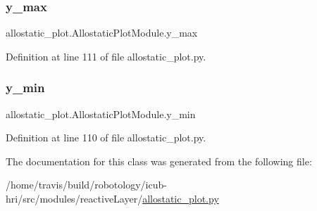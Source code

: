 \subsubsection{\texorpdfstring{y\+\_\+max}{y\_max}}
{\footnotesize\ttfamily allostatic\+\_\+plot.\+Allostatic\+Plot\+Module.\+y\+\_\+max}



Definition at line 111 of file allostatic\+\_\+plot.\+py.

\mbox{\label{classallostatic__plot_1_1AllostaticPlotModule_a101cadb34446fbbebc108d35cf9c3770}} 
\subsubsection{\texorpdfstring{y\+\_\+min}{y\_min}}
{\footnotesize\ttfamily allostatic\+\_\+plot.\+Allostatic\+Plot\+Module.\+y\+\_\+min}



Definition at line 110 of file allostatic\+\_\+plot.\+py.



The documentation for this class was generated from the following file\+:\begin{DoxyCompactItemize}
\item 
/home/travis/build/robotology/icub-\/hri/src/modules/reactive\+Layer/\hyperlink{allostatic__plot_8py}{allostatic\+\_\+plot.\+py}\end{DoxyCompactItemize}
